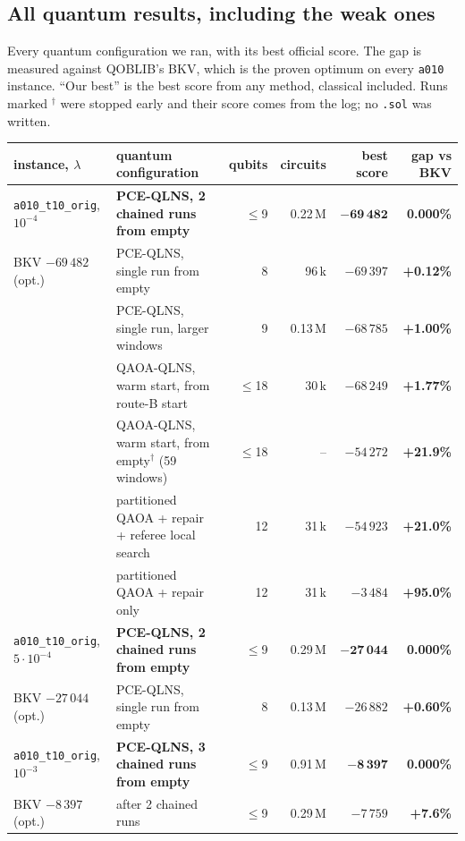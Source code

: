 \documentclass[11pt]{article}
\newcommand{\gapgood}[1]{\textcolor{good}{\textbf{#1}}}
\newcommand{\gapmid}[1]{\textcolor{mid}{\textbf{#1}}}
\newcommand{\gapbad}[1]{\textcolor{bad}{\textbf{#1}}}
\begin{document}
\subsection{All quantum results, including the weak ones}\label{sec:allq}
Every quantum configuration we ran, with its best official score. The gap is measured against QOBLIB's
BKV, which is the proven optimum on every \texttt{a010} instance. ``Our best'' is the best score from any
method, classical included. Runs marked $^\dagger$ were stopped early and their score comes from the
log; no \texttt{.sol} was written.
\begin{center}\small
\renewcommand{\arraystretch}{1.15}
\begin{tabularx}{\textwidth}{@{}>{\raggedright\arraybackslash}p{30mm}Lrrrr@{}}
\toprule
instance, $\lambda$ & quantum configuration & qubits & circuits & best score & gap vs BKV\\
\midrule
\texttt{a010\_t10\_orig}, $10^{-4}$ & \textbf{PCE-QLNS, 2 chained runs from empty} & $\le$9 & 0.22\,M & $\mathbf{-69\,482}$ & \gapgood{0.000\%}\\
\footnotesize BKV $-69\,482$ (opt.) & PCE-QLNS, single run from empty & 8 & 96\,k & $-69\,397$ & \gapmid{+0.12\%}\\
 & PCE-QLNS, single run, larger windows & 9 & 0.13\,M & $-68\,785$ & \gapmid{+1.00\%}\\
 & QAOA-QLNS, warm start, from route-B start & $\le$18 & 30\,k & $-68\,249$ & \gapmid{+1.77\%}\\
 & QAOA-QLNS, warm start, from empty$^\dagger$ (59 windows) & $\le$18 & -- & $-54\,272$ & \gapbad{+21.9\%}\\
 & partitioned QAOA + repair + referee local search & 12 & 31\,k & $-54\,923$ & \gapbad{+21.0\%}\\
 & partitioned QAOA + repair only & 12 & 31\,k & $-3\,484$ & \gapbad{+95.0\%}\\
\midrule
\texttt{a010\_t10\_orig}, $5\cdot10^{-4}$ & \textbf{PCE-QLNS, 2 chained runs from empty} & $\le$9 & 0.29\,M & $\mathbf{-27\,044}$ & \gapgood{0.000\%}\\
\footnotesize BKV $-27\,044$ (opt.) & PCE-QLNS, single run from empty & 8 & 0.13\,M & $-26\,882$ & \gapmid{+0.60\%}\\
\midrule
\texttt{a010\_t10\_orig}, $10^{-3}$ & \textbf{PCE-QLNS, 3 chained runs from empty} & $\le$9 & 0.91\,M & $\mathbf{-8\,397}$ & \gapgood{0.000\%}\\
\footnotesize BKV $-8\,397$ (opt.) & after 2 chained runs & $\le$9 & 0.29\,M & $-7\,759$ & \gapmid{+7.6\%}\\

\end{tabularx}
\end{center}
\end{document}
